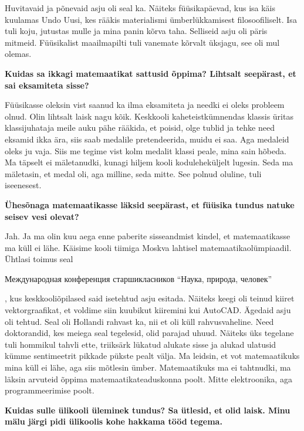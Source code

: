 Huvitavaid ja põnevaid asju oli seal ka. Näiteks füüsikapäevad, kus
isa käis kuulamas Undo Uusi, kes rääkis materialismi
ümberlükkamisest filosoofiliselt. Isa tuli koju, jutustas mulle ja mina panin kõrva
taha. Selliseid asju oli päris mitmeid. Füüsikalist maailmapilti
tuli vanemate kõrvalt üksjagu, see oli mul olemas.

\textbf{Kuidas sa ikkagi matemaatikat sattusid õppima? Lihtsalt
seepärast, et sai eksamiteta sisse?}

Füüsikasse oleksin vist saanud ka ilma eksamiteta ja needki ei oleks probleem
olnud. Olin lihtsalt laisk nagu kõik. Keskkooli kaheteistkümnendas klassis üritas
klassijuhataja meile auku pähe
rääkida, et poisid, olge tublid ja tehke need eksamid ikka ära, siis saab
medalile pretendeerida, muidu ei saa. Aga medaleid oleks ju vaja. Siis me
tegime vist kolm medalit klassi peale, mina sain hõbeda. Ma täpselt
ei mäletanudki, kunagi hiljem kooli koduleheküljelt lugesin. Seda ma mäletasin,
et medal oli, aga milline, seda mitte. See polnud oluline, tuli
iseenesest.

\textbf{Ühesõnaga matemaatikasse läksid seepärast, et füüsika
tundus natuke seisev vesi olevat?}

Jah. Ja ma olin kuu aega enne paberite sisseandmist kindel, et matemaatikasse
ma küll ei lähe. Käisime kooli tiimiga Moskva lahtisel
matemaatikaolümpiaadil.
Ühtlasi toimus seal \begin{russian}Международная конференция старшикласников
\enquote{Наука, природа, человек}\end{russian}, kus
keskkooliõpilased said isetehtud asju esitada. Näiteks keegi oli teinud kiiret
vektorgraafikat, et voldime siin kuubikut kiiremini kui AutoCAD. Ägedaid asju oli tehtud. Seal oli Hollandi rahvast ka, nii et oli küll
rahvusvaheline. Need doktorandid, kes meiega seal tegelesid, olid
parajad uhuud. Näiteks üks tegelane tuli hommikul tahvli ette, triiksärk
lükatud alukate sisse ja alukad ulatusid kümme sentimeetrit pikkade pükste
pealt välja. Ma leidsin, et vot matemaatikuks
mina küll ei lähe, aga siis mõtlesin ümber. Matemaatikuks ma ei
tahtnudki, ma läksin arvuteid õppima matemaatikateaduskonna poolt. Mitte elektroonika, aga
programmeerimise poolt.

\textbf{Kuidas sulle ülikooli üleminek tundus? Sa ütlesid, et olid
laisk. Minu mälu järgi pidi ülikoolis kohe hakkama tööd tegema.}


